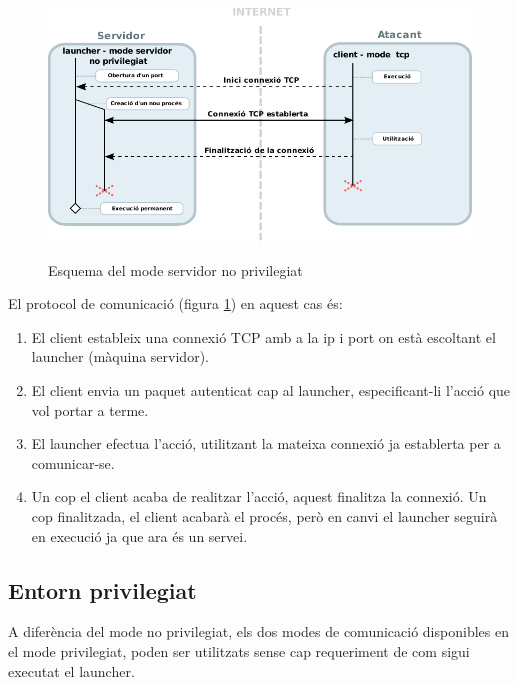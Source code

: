 \begin{figure}[htp]
    \centering
    \includegraphics[scale=1.2,keepaspectratio]{diagrames/solutionDesignUnprivilegedServerMode.pdf} \\
    \caption{Esquema del mode servidor no privilegiat}
    \label{fig:modeUnprivilegedServer}
\end{figure}

El protocol de comunicació (figura \ref{fig:modeUnprivilegedServer}) en aquest cas és: \\

\begin{enumerate}
    \item El client estableix una connexió TCP amb a la ip i port on està escoltant el launcher (màquina servidor).
    \item El client envia un paquet autenticat cap al launcher, especificant-li l'acció que vol portar a terme.
    \item El launcher efectua l'acció, utilitzant la mateixa connexió ja establerta per a comunicar-se.
    \item Un cop el client acaba de realitzar l'acció, aquest finalitza la connexió. Un cop finalitzada, el client acabarà el 
        procés, però en canvi el launcher seguirà en execució ja que ara és un servei.
\end{enumerate}

\subsection{Entorn privilegiat} \label{sec:disseny_mode_privilegiat}

A diferència del mode no privilegiat, els dos modes de comunicació disponibles en el mode privilegiat, poden ser 
utilitzats sense cap requeriment de com sigui executat el launcher. \\

